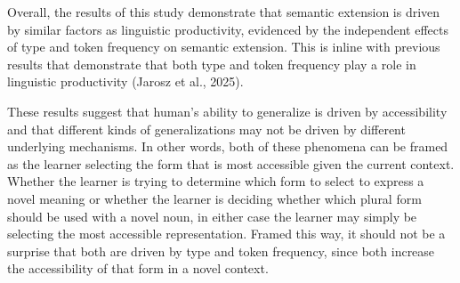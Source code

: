\documentclass[
  letterpaper,
  DIV=11,
  numbers=noendperiod]{scrartcl}
\begin{document}
Overall, the results of this study demonstrate that semantic extension
is driven by similar factors as linguistic productivity, evidenced by
the independent effects of type and token frequency on semantic
extension. This is inline with previous results that demonstrate that
both type and token frequency play a role in linguistic productivity
(Jarosz et al., 2025).

These results suggest that human's ability to generalize is driven by
accessibility and that different kinds of generalizations may not be
driven by different underlying mechanisms. In other words, both of these
phenomena can be framed as the learner selecting the form that is most
accessible given the current context. Whether the learner is trying to
determine which form to select to express a novel meaning or whether the
learner is deciding whether which plural form should be used with a
novel noun, in either case the learner may simply be selecting the most
accessible representation. Framed this way, it should not be a surprise
that both are driven by type and token frequency, since both increase
the accessibility of that form in a novel context.

\newpage
\end{document}
